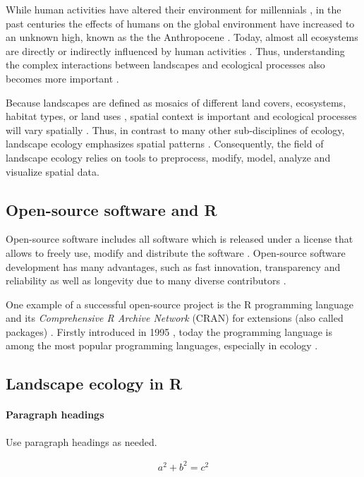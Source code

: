 \documentclass[smallextended]{svjour3}       %
\begin{document}
While human activities have altered their environment for millennials
\cite{Ellis2011}, in the past centuries the effects of humans on the
global environment have increased to an unknown high, known as the the
Anthropocene \cite{Crutzen2002}. Today, almost all ecosystems are
directly or indirectly influenced by human activities
\cite{Vitousek1997}. Thus, understanding the complex interactions
between landscapes and ecological processes also becomes more important
\cite{With2019}.

Because landscapes are defined as mosaics of different land covers,
ecosystems, habitat types, or land uses \cite{Forman1986,Forman1995},
spatial context is important and ecological processes will vary
spatially \cite{With2019}. Thus, in contrast to many other
sub-disciplines of ecology, landscape ecology emphasizes spatial
patterns \cite{Risser1984}. Consequently, the field of landscape ecology
relies on tools to preprocess, modify, model, analyze and visualize
spatial data.

\hypertarget{sec:open_source}{%
\subsection{Open-source software and R}\label{sec:open_source}}

Open-source software includes all software which is released under a
license that allows to freely use, modify and distribute the software
\cite{St.Laurent2008}. Open-source software development has many
advantages, such as fast innovation, transparency and reliability as
well as longevity due to many diverse contributors
\cite{vonKrogh2006,St.Laurent2008}.

One example of a successful open-source project is the R programming
language and its \emph{Comprehensive R Archive Network} (CRAN) for
extensions (also called packages) \cite{RCoreTeam2019}. Firstly
introduced in 1995 \cite{Smith2016}, today the programming language is
among the most popular programming languages, especially in ecology
\cite{Lai2019}.

\hypertarget{sec:R}{%
\subsection{Landscape ecology in R}\label{sec:R}}

\hypertarget{paragraph-headings}{%
\paragraph{Paragraph headings}\label{paragraph-headings}}

Use paragraph headings as needed.

\begin{align}
a^2+b^2=c^2
\end{align}



\end{document}
